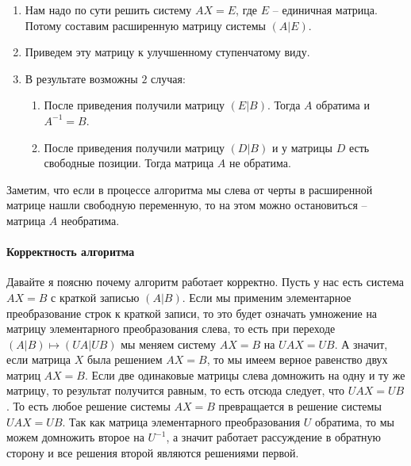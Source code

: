 \begin{enumerate}
\item Нам надо по сути решить систему $AX = E$, где $E$ -- единичная матрица.
Потому составим расширенную матрицу системы $(A|E)$.

\item Приведем эту матрицу к улучшенному ступенчатому виду.

\item В результате возможны $2$ случая:
\begin{enumerate}
\item После приведения получили матрицу $(E|B)$.
Тогда $A$ обратима и $A^{-1} = B$.

\item После приведения получили матрицу $(D|B)$ и у матрицы $D$ есть свободные позиции.
Тогда матрица $A$ не обратима.
\end{enumerate}
\end{enumerate}
Заметим, что если в процессе алгоритма мы слева от черты в расширенной матрице нашли свободную переменную, то на этом можно остановиться -- матрица $A$ необратима.

\paragraph{Корректность алгоритма}

Давайте я поясню почему алгоритм работает корректно.
Пусть у нас есть система $AX  = B$ с краткой записью $(A|B)$.
Если мы применим элементарное преобразование строк к краткой записи, то это будет означать умножение на матрицу элементарного преобразования слева, то есть при переходе $(A|B)\mapsto (UA|UB)$ мы меняем систему $AX = B$ на $UAX = UB$.
А значит, если матрица $X$ была решением $AX = B$, то мы имеем верное равенство двух матриц $AX = B$.
Если две одинаковые матрицы слева домножить на одну и ту же матрицу, то результат получится равным, то есть отсюда следует, что $UAX = UB$.
То есть любое решение системы $AX = B$ превращается в решение системы $UAX = UB$.
Так как матрица элементарного преобразования $U$ обратима, то мы можем домножить второе на $U^{-1}$, а значит работает рассуждение в обратную сторону и все решения второй являются решениями первой.

